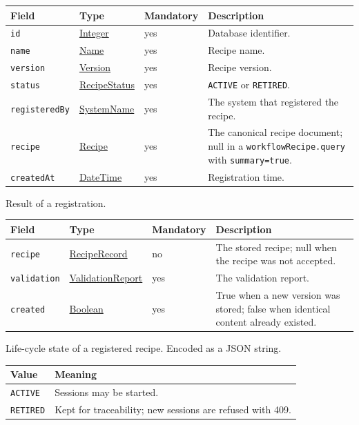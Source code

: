 \documentclass[a4paper]{arrowhead}
\newcommand{\mref}[1]{{\textcolor{ArrowheadPurple}{\hyperref[sec:model:#1]{#1}}}}
\newcommand{\pref}[1]{{\textcolor{ArrowheadGrey}{\hyperref[sec:model:primitives:#1]{#1}}}}
\begin{document}
{\small
\begin{longtable}{|p{3.7cm}|p{4.2cm}|p{1.6cm}|p{6.3cm}|}

\hline
\rowcolor{gray!33} Field & Type & Mandatory & Description \\ \hline
\endhead
\texttt{id} & \pref{Integer} & yes & Database identifier. \\ \hline
\texttt{name} & \pref{Name} & yes & Recipe name. \\ \hline
\texttt{version} & \pref{Version} & yes & Recipe version. \\ \hline
\texttt{status} & \mref{RecipeStatus} & yes & \texttt{ACTIVE} or \texttt{RETIRED}. \\ \hline
\texttt{registeredBy} & \pref{SystemName} & yes & The system that registered the recipe. \\ \hline
\texttt{recipe} & \mref{Recipe} & yes & The canonical recipe document; null in a \texttt{workflow\allowbreak{}Recipe.\allowbreak{}query} with \texttt{summary=true}. \\ \hline
\texttt{createdAt} & \pref{DateTime} & yes & Registration time. \\ \hline
\end{longtable}
}

Result of a registration.

{\small
\begin{longtable}{|p{3.7cm}|p{4.2cm}|p{1.6cm}|p{6.3cm}|}

\hline
\rowcolor{gray!33} Field & Type & Mandatory & Description \\ \hline
\endhead
\texttt{recipe} & \mref{RecipeRecord} & no & The stored recipe; null when the recipe was not accepted. \\ \hline
\texttt{validation} & \mref{ValidationReport} & yes & The validation report. \\ \hline
\texttt{created} & \pref{Boolean} & yes & True when a new version was stored; false when identical content already existed. \\ \hline
\end{longtable}
}

Life-cycle state of a registered recipe.
 Encoded as a JSON string.
{\small
\begin{longtable}{|p{3.9cm}|p{11.9cm}|}

\hline
\rowcolor{gray!33} Value & Meaning \\ \hline
\endhead
\texttt{ACTIVE} & Sessions may be started. \\ \hline
\texttt{RETIRED} & Kept for traceability; new sessions are refused with 409. \\ \hline
\end{longtable}
}
\end{document}
